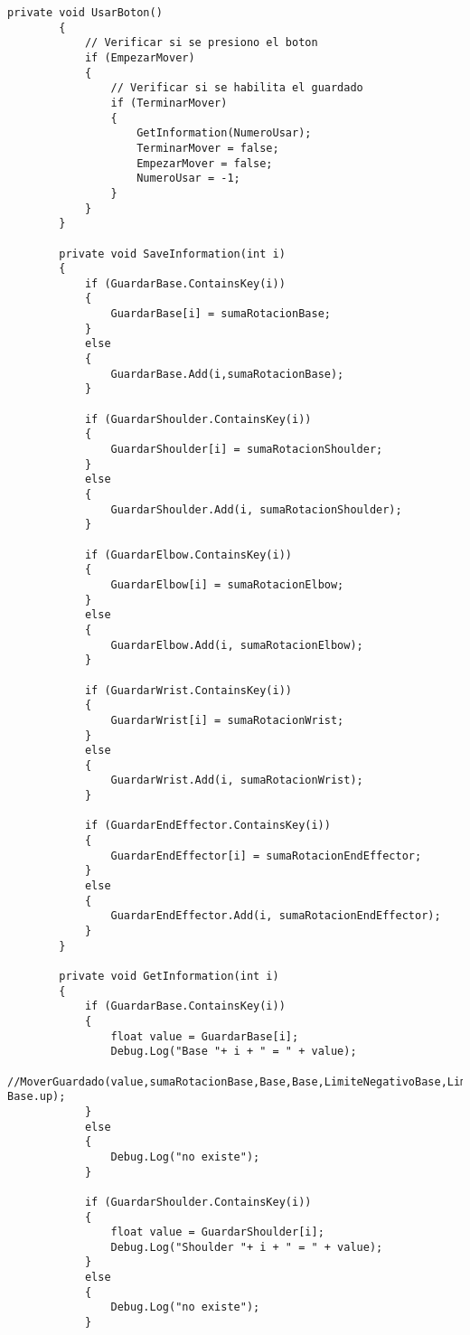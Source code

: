 \begin{lstlisting}[frame=single]
        private void UsarBoton()
        {
            // Verificar si se presiono el boton
            if (EmpezarMover)
            {
                // Verificar si se habilita el guardado
                if (TerminarMover)
                {
                    GetInformation(NumeroUsar);
                    TerminarMover = false;
                    EmpezarMover = false;
                    NumeroUsar = -1;
                }
            }
        }

        private void SaveInformation(int i)
        {
            if (GuardarBase.ContainsKey(i))
            {
                GuardarBase[i] = sumaRotacionBase;
            }
            else
            {
                GuardarBase.Add(i,sumaRotacionBase);
            }

            if (GuardarShoulder.ContainsKey(i))
            {
                GuardarShoulder[i] = sumaRotacionShoulder;
            }
            else
            {
                GuardarShoulder.Add(i, sumaRotacionShoulder);
            }

            if (GuardarElbow.ContainsKey(i))
            {
                GuardarElbow[i] = sumaRotacionElbow;
            }
            else
            {
                GuardarElbow.Add(i, sumaRotacionElbow);
            }

            if (GuardarWrist.ContainsKey(i))
            {
                GuardarWrist[i] = sumaRotacionWrist;
            }
            else
            {
                GuardarWrist.Add(i, sumaRotacionWrist);
            }

            if (GuardarEndEffector.ContainsKey(i))
            {
                GuardarEndEffector[i] = sumaRotacionEndEffector;
            }
            else
            {
                GuardarEndEffector.Add(i, sumaRotacionEndEffector);
            }
        }

        private void GetInformation(int i)
        {
            if (GuardarBase.ContainsKey(i))
            {
                float value = GuardarBase[i];
                Debug.Log("Base "+ i + " = " + value);
                //MoverGuardado(value,sumaRotacionBase,Base,Base,LimiteNegativoBase,LimitePositivoBase,velocidadRotacionBase,-Base.up);
            }
            else
            {
                Debug.Log("no existe");
            }

            if (GuardarShoulder.ContainsKey(i))
            {
                float value = GuardarShoulder[i];
                Debug.Log("Shoulder "+ i + " = " + value);
            }
            else
            {
                Debug.Log("no existe");
            }


\end{lstlisting}
